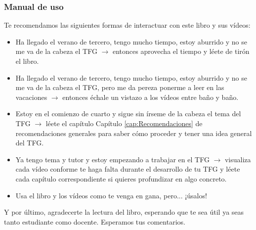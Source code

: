 \subsubsection*{Manual de uso}

Te recomendamos las siguientes formas de interactuar con este libro y sus vídeos:

\begin{itemize} \item Ha llegado el verano de tercero, tengo mucho tiempo, estoy aburrido y no se me va de la cabeza el TFG $\rightarrow$ entonces aprovecha el tiempo y léete de tirón el libro.

\item Ha llegado el verano de tercero, tengo mucho tiempo, estoy aburrido y no se me va de la cabeza el TFG, pero me da pereza ponerme a leer en las vacaciones $\rightarrow$ entonces échale un vistazo a los vídeos entre baño y baño.

\item Estoy en el comienzo de cuarto y sigue sin írseme de la cabeza el tema del TFG $\rightarrow$ léete el capítulo Capítulo \ref{cap:Recomendaciones} de recomendaciones generales para saber cómo proceder y tener una idea general del TFG.

\item Ya tengo tema y tutor y estoy empezando a trabajar en el TFG $\rightarrow$ visualiza cada vídeo conforme te haga falta durante el desarrollo de tu TFG y léete cada capítulo correspondiente si quieres profundizar en algo concreto.

\item Usa el libro y los vídeos como te venga en gana, pero... ¡úsalos! \end{itemize}

Y por último, agradecerte la lectura del libro, esperando que te sea útil ya seas tanto estudiante como docente. Esperamos tus comentarios.


